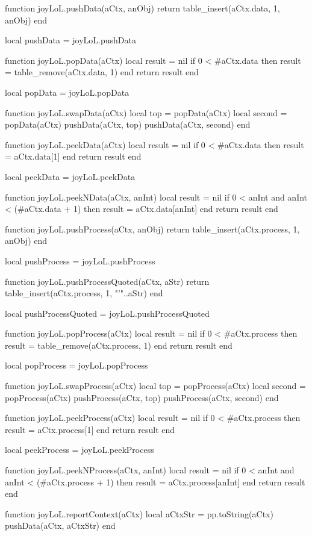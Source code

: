 function joyLoL.pushData(aCtx, anObj)
  return table_insert(aCtx.data, 1, anObj)
end

local pushData = joyLoL.pushData

function joyLoL.popData(aCtx)
  local result = nil
  if 0 < #aCtx.data then
    result = table_remove(aCtx.data, 1)
  end
  return result
end

local popData = joyLoL.popData

function joyLoL.swapData(aCtx)
  local top    = popData(aCtx)
  local second = popData(aCtx)
  pushData(aCtx, top)
  pushData(aCtx, second)
end

function joyLoL.peekData(aCtx)
  local result = nil
  if 0 < #aCtx.data then
    result = aCtx.data[1]
  end
  return result
end

local peekData = joyLoL.peekData

function joyLoL.peekNData(aCtx, anInt)
  local result = nil
  if 0 < anInt and anInt < (#aCtx.data + 1) then
    result = aCtx.data[anInt]
  end
  return result
end

function joyLoL.pushProcess(aCtx, anObj)
  return table_insert(aCtx.process, 1, anObj)
end

local pushProcess = joyLoL.pushProcess

function joyLoL.pushProcessQuoted(aCtx, aStr)
  return table_insert(aCtx.process, 1, "'"..aStr)
end

local pushProcessQuoted = joyLoL.pushProcessQuoted

function joyLoL.popProcess(aCtx)
  local result = nil
  if 0 < #aCtx.process then
    result = table_remove(aCtx.process, 1)
  end
  return result
end

local popProcess = joyLoL.popProcess

function joyLoL.swapProcess(aCtx)
  local top    = popProcess(aCtx)
  local second = popProcess(aCtx)
  pushProcess(aCtx, top)
  pushProcess(aCtx, second)
end

function joyLoL.peekProcess(aCtx)
  local result = nil
  if 0 < #aCtx.process then
    result = aCtx.process[1]
  end
  return result
end

local peekProcess = joyLoL.peekProcess

function joyLoL.peekNProcess(aCtx, anInt)
  local result = nil
  if 0 < anInt and anInt < (#aCtx.process + 1) then
    result = aCtx.process[anInt]
  end
  return result
end

function joyLoL.reportContext(aCtx)
  local aCtxStr = pp.toString(aCtx)
  pushData(aCtx, aCtxStr)
end

